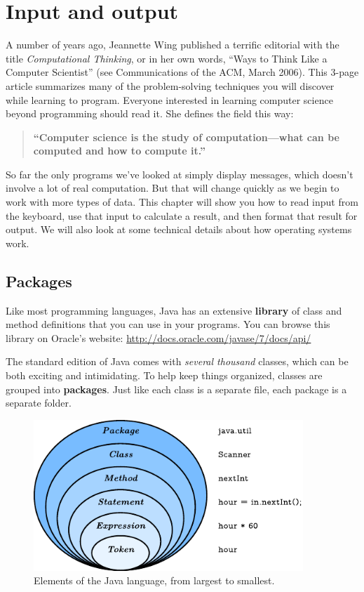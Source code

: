 \chapter{Input and output}

A number of years ago, Jeannette Wing published a terrific editorial with the title {\it Computational Thinking}, or in her own words, ``Ways to Think Like a Computer Scientist'' (see Communications of the ACM, March 2006).
This 3-page article summarizes many of the problem-solving techniques you will discover while learning to program.
Everyone interested in learning computer science beyond programming should read it.
She defines the field this way:

\begin{quote}
{\bf ``Computer science is the study of computation---what can be computed and how to compute it.''}
\end{quote}

So far the only programs we've looked at simply display messages, which doesn't involve a lot of real computation.
But that will change quickly as we begin to work with more types of data.
This chapter will show you how to read input from the keyboard, use that input to calculate a result, and then format that result for output.
We will also look at some technical details about how operating systems work.


\section{Packages}


Like most programming languages, Java has an extensive {\bf library} of class and method definitions that you can use in your programs.
You can browse this library on Oracle's website:
\url{http://docs.oracle.com/javase/7/docs/api/}


The standard edition of Java comes with {\em several thousand} classes, which can be both exciting and intimidating.
To help keep things organized, classes are grouped into {\bf packages}.
Just like each class is a separate file, each package is a separate folder.

\begin{figure}[h!]
\includegraphics[width=4in]{package.pdf}
\caption{Elements of the Java language, from largest to smallest.}
\end{figure}

